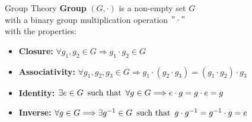 \begin{frame}{Group Theory}
    \textbf{Group} \((G,\cdot)\) is a non-empty set \(G\) \\
    with a binary group multiplication operation \("\cdot"\) \\
    with the properties: \newline
    \begin{itemize}
        \setlength{\itemsep}{1.25\baselineskip}
        \item \textbf{Closure:}
        \(\forall g_1,g_2\in G\Longrightarrow g_1\cdot g_2\in G\)
        \item \textbf{Associativity:}
        \(\forall g_1,g_2,g_3\in G\Longrightarrow g_1\cdot(g_2\cdot g_3)=(g_1\cdot g_2)\cdot g_3\)
        \item \textbf{Identity:}
        \(\exists e\in G\operatorname{\text{ such that }}\forall g\in G\Longrightarrow e\cdot g=g\cdot e=g\)
        \item \textbf{Inverse:}
        \(\forall g\in G\Longrightarrow\exists g^{-1}\in G\operatorname{\text{ such that }} g\cdot g^{-1}=g^{-1}\cdot g=e\)
    \end{itemize}

    \vspace*{8mm}

\end{frame}